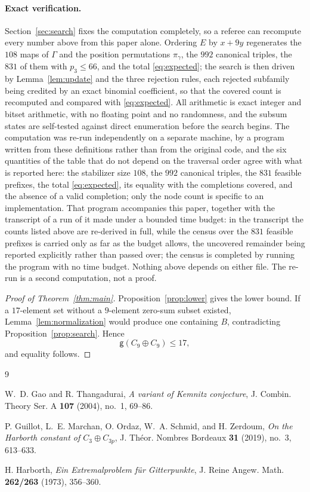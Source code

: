 \documentclass[11pt]{amsart}
\begin{document}
\paragraph{Exact verification.}
Section~\ref{sec:search} fixes the computation completely, so a referee can
recompute every number above from this paper alone. Ordering $E$ by $x+9y$
regenerates the $108$ maps of $\Gamma$ and the position permutations
$\pi_\gamma$, the $992$ canonical triples, the $831$ of them with
$p_3\leq66$, and the total \eqref{eq:expected}; the search is then driven by
Lemma~\ref{lem:update} and the three rejection rules, each rejected
subfamily being credited by an exact binomial coefficient, so that the
covered count is recomputed and compared with \eqref{eq:expected}. All
arithmetic is exact integer and bitset arithmetic, with no floating point
and no randomness, and the subsum states are self-tested against direct
enumeration before the search begins. The computation was re-run
independently on a separate machine, by a program written from these
definitions rather than from the original code, and the six quantities of
the table that do not depend on the traversal order agree with what is
reported here: the stabilizer size $108$, the $992$ canonical triples, the
$831$ feasible prefixes, the total \eqref{eq:expected}, its equality with
the completions covered, and the absence of a valid completion; only the
node count is specific to an implementation. That program accompanies this
paper, together with the transcript of a run of it made under a bounded time
budget: in the transcript the counts listed above are re-derived in full,
while the census over the $831$ feasible prefixes is carried only as far as
the budget allows, the uncovered remainder being reported explicitly rather
than passed over; the census is completed by running the program with no time
budget. Nothing above depends on either file. The re-run is a second
computation, not a proof.

\begin{proof}[Proof of Theorem~\ref{thm:main}]
Proposition~\ref{prop:lower} gives the lower bound. If a $17$-element set
without a $9$-element zero-sum subset existed,
Lemma~\ref{lem:normalization} would produce one containing $B$,
contradicting Proposition~\ref{prop:search}. Hence
\[
  \mathsf g(C_9\oplus C_9)\leq17,
\]
and equality follows.
\end{proof}

\begin{thebibliography}{9}

W.~D. Gao and R. Thangadurai,
\emph{A variant of Kemnitz conjecture},
J. Combin. Theory Ser. A \textbf{107} (2004), no.~1, 69--86.

P. Guillot, L.~E. Marchan, O. Ordaz, W.~A. Schmid, and H. Zerdoum,
\emph{On the Harborth constant of $C_3\oplus C_{3p}$},
J. Th\'eor. Nombres Bordeaux \textbf{31} (2019), no.~3, 613--633.

H. Harborth,
\emph{Ein Extremalproblem f\"ur Gitterpunkte},
J. Reine Angew. Math. \textbf{262/263} (1973), 356--360.

\end{thebibliography}
\end{document}
